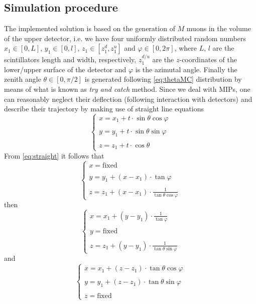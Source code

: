 \subsection{Simulation procedure}
The implemented solution is based on the generation of $M$ muons in the volume of the upper detector, i.e. we have four uniformly distributed random numbers $x_1\in\left[0, L\right]$, $y_1\in\left[0, l\right]$, $z_1\in\left[z_1^{d},z_1^{u}\right]$ and $\varphi\in\left[0, 2\pi\right]$, where $L$, $l$ are the scintillators length and width, respectively, $z_1^{d/u}$ are the $z$-coordinates of the lower/upper surface of the detector and $\varphi$ is the azimutal angle. Finally the zenith angle $\theta\in\left[0, \pi/2\right]$ is generated following \eqref{eq:thetaMC} distribution by means of what is known as \emph{try and catch} method. Since we deal with MIPs, one can reasonably neglect their deflection (following interaction with detectors) and describe their trajectory by making use of straight line equations
\begin{equation}\label{eq:straight}
\left\{
\begin{array}{l}
x = x_1 + t\cdot\sin\theta\cos\varphi\\\\
y = y_1 + t\cdot\sin\theta\sin\varphi\\\\
z = z_1 + t\cdot\cos\theta
\end{array}
\right.
\end{equation}
From \eqref{eq:straight} it follows that
\begin{equation}
\left\{
\begin{array}{l}
x = \textrm{fixed}\\\\
y = y_1 + (x-x_1)\cdot\tan\varphi\\\\
z = z_1 + (x-x_1)\cdot\displaystyle\frac{1}{\tan\theta\cos\varphi}
\end{array}
\right.
\end{equation}
then
\begin{equation}
\left\{
\begin{array}{l}
x = x_1 + (y-y_1)\cdot\displaystyle\frac{1}{\tan\varphi}\\\\
y = \textrm{fixed}\\\\
z = z_1 + (y-y_1)\cdot\displaystyle\frac{1}{\tan\theta\sin\varphi}
\end{array}
\right.
\end{equation}
and
\begin{equation}
\left\{
\begin{array}{l}
x = x_1 + (z-z_1)\cdot\tan\theta\cos\varphi\\\\
y = y_1 + (z-z_1)\cdot\tan\theta\sin\varphi\\\\
z = \textrm{fixed}
\end{array}
\right.
\end{equation}

